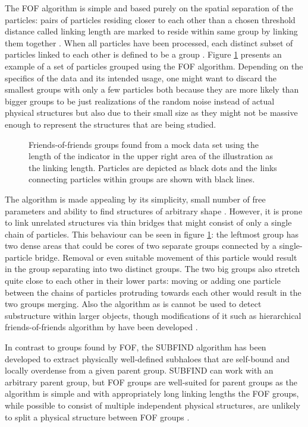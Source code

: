 \documentclass[english, oneside]{HYgradu}
\begin{document}
The FOF algorithm is simple and based purely on the spatial separation of the particles: pairs of particles residing closer to each other than a chosen threshold distance called linking length are marked to reside within same group by linking them together \citep{davis1985evolution}. When all particles have been processed, each distinct subset of particles linked to each other is defined to be a group \citep{davis1985evolution}. Figure \ref{fig:fof} presents an example of a set of particles grouped using the FOF algorithm. Depending on the specifics of the data and its intended usage, one might want to discard the smallest groups with only a few particles both because they are more likely than bigger groups to be just realizations of the random noise instead of actual physical structures but also due to their small size as they might not be massive enough to represent the structures that are being studied.

\begin{figure}
    \centering
    
    \caption{Friends-of-friends groups found from a mock data set using the length of the indicator in the upper right area of the illustration as the linking length. Particles are depicted as black dots and the links connecting particles within groups are shown with black lines.}\label{fig:fof}
\end{figure}

The algorithm is made appealing by its simplicity, small number of free parameters and ability to find structures of arbitrary shape \citep{davis1985evolution}. However, it is prone to link unrelated structures via thin bridges that might consist of only a single chain of particles. This behaviour can be seen in figure \ref{fig:fof}: the leftmost group has two dense areas that could be cores of two separate groups connected by a single-particle bridge. Removal or even suitable movement of this particle would result in the group separating into two distinct groups. The two big groups also stretch quite close to each other in their lower parts: moving or adding one particle between the chains of particles protruding towards each other would result in the two groups merging. Also the algorithm as is cannot be used to detect substructure within larger objects, though modifications of it such as hierarchical friends-of-friends algorithm by \citet{Gottlober1999halo} have been developed \cite{springel2001populating}.

In contrast to groups found by FOF, the SUBFIND algorithm has been developed to extract physically well-defined subhaloes that are self-bound and locally overdense from a given parent group. SUBFIND can work with an arbitrary parent group, but FOF groups are well-suited for parent groups as the algorithm is simple and with appropriately long linking lengths the FOF groups, while possible to consist of multiple independent physical structures, are unlikely to split a physical structure between FOF groups \citep{springel2001populating}.
\end{document}
